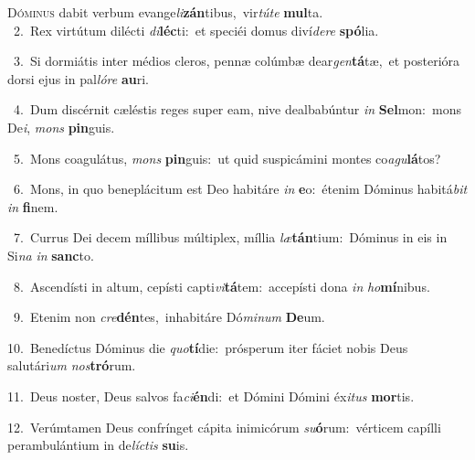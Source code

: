 \lettrine{\initial\textcolor{\initialcolor}{D}}{óminus} dabit verbum evange\-\textit{li}\-\textbf{zán}tibus,~\star vir\-\textit{tú}\-\textit{te} \textbf{mul}\-ta.\\
{\numbfont\textcolor{\numbcolor}{~2.}}~Rex virtútum dilécti \textit{di}\-\textbf{léc}ti:~\star et speciéi domus diví\-\textit{de}\-\textit{re} \textbf{spó}\-lia.\par
{\numbfont\textcolor{\numbcolor}{~3.}}~Si dormiátis inter médios cleros, pennæ colúmbæ dear\-\textit{gen}\-\textbf{tá}tæ,~\star et posterióra dorsi ejus in pal\-\textit{ló}\-\textit{re} \textbf{au}\-ri.\par
{\numbfont\textcolor{\numbcolor}{~4.}}~Dum discérnit cæléstis reges super eam, nive dealbabúntur \textit{in} \textbf{Sel}\-mon:~\star mons De\-\textit{i}\-, \textit{mons} \textbf{pin}\-guis.\par
{\numbfont\textcolor{\numbcolor}{~5.}}~Mons coagulátus, \textit{mons} \textbf{pin}\-guis:~\star ut quid suspicámini montes co\-\textit{a}\-\textit{gu}\textbf{lá}tos?\par
{\numbfont\textcolor{\numbcolor}{~6.}}~Mons, in quo beneplácitum est Deo habitáre \textit{in} \textbf{e}\-o:~\star étenim Dóminus habitá\textit{bit} \textit{in} \textbf{fi}\-nem.\par
{\numbfont\textcolor{\numbcolor}{~7.}}~Currus Dei decem míllibus múltiplex, míllia \textit{læ}\-\textbf{tán}tium:~\star Dóminus in eis in Si\textit{na} \textit{in} \textbf{sanc}\-to.\par
{\numbfont\textcolor{\numbcolor}{~8.}}~Ascendísti in altum, cepísti capti\-\textit{vi}\-\textbf{tá}tem:~\star accepísti dona \textit{in} \textit{ho}\-\textbf{mí}nibus.\par
{\numbfont\textcolor{\numbcolor}{~9.}}~Etenim non \textit{cre}\-\textbf{dén}tes,~\star inhabitáre Dó\-\textit{mi}\-\textit{num} \textbf{De}\-um.\par
{\numbfont\textcolor{\numbcolor}{10.}}~Benedíctus Dóminus die \textit{quo}\-\textbf{tí}die:~\star prósperum iter fáciet nobis Deus salutári\textit{um} \textit{nos}\-\textbf{tró}rum.\par
{\numbfont\textcolor{\numbcolor}{11.}}~Deus noster, Deus salvos fa\-\textit{ci}\-\textbf{én}di:~\star et Dómini Dómini éx\-\textit{i}\-\textit{tus} \textbf{mor}\-tis.\par
{\numbfont\textcolor{\numbcolor}{12.}}~Verúmtamen Deus confrínget cápita inimicórum \textit{su}\-\textbf{ó}rum:~\star vérticem capílli perambulántium in de\-\textit{líc}\-\textit{tis} \textbf{su}\-is.\par
